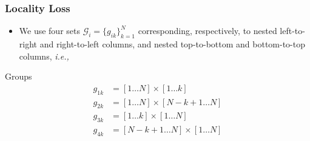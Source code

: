 \begin{frame}
	\frametitle{Locality Loss}

	\begin{itemize}
		\item We use four sets $\mathcal G_i = \{g_{ik}\}_{k=1}^N$ corresponding, respectively, to nested
	left-to-right and right-to-left columns, and nested top-to-bottom and bottom-to-top columns,
	\textit{i.e.,}
	\end{itemize}
	\begin{block}{Groups}
		\vspace{-15pt}
		\begin{align*}
			g_{1k} & = [1 \ldots N] \times [1 \ldots k] \\
			g_{2k} & = [1 \ldots N] \times [N-k+1 \ldots N] \\
			g_{3k} & = [1 \ldots k] \times [1 \ldots N] \\
			g_{4k} & = [N-k+1 \ldots N] \times [1 \ldots N]
		\end{align*}
	\end{block}

	\vspace{-10pt}
	\begin{figure}
		~~
		~~
	\end{figure}
\end{frame}


